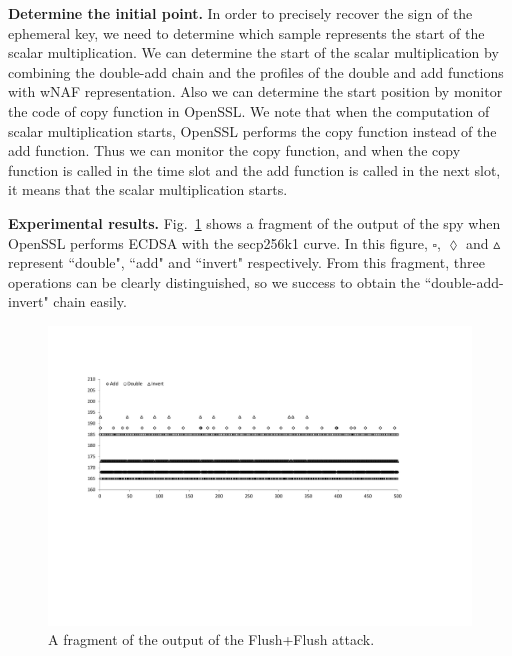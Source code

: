 \noindent\textbf{Determine the initial point.}
In order to precisely recover the sign of the ephemeral key, we need to determine which sample represents the start of the scalar multiplication.
We can determine the
start of the scalar multiplication
by combining the double-add chain and the profiles of the double and add functions with wNAF representation.
Also we can determine the start position by monitor the code of copy function in OpenSSL.
 We note that when the computation of scalar multiplication starts, OpenSSL performs the copy function instead of the add function.
 Thus we can monitor the copy function, and when the copy function is called in the time slot and the add function is called in the next slot, it means that the scalar multiplication starts.


\noindent\textbf{Experimental results.}
Fig.~\ref{fig1} shows a fragment of the output of the spy when OpenSSL performs ECDSA with the secp256k1 curve.
In this figure, $\square$, $\lozenge$ and $\vartriangle$ represent ``double", ``add" and ``invert" respectively.
From this fragment, three operations can be clearly distinguished,
 so we success to obtain the ``double-add-invert" chain easily.




\begin{figure}
\centering
\includegraphics[width=\textwidth]{pic/slot2500.pdf}
\caption{A fragment of the output of the Flush+Flush attack.} \label{fig1}
\end{figure}


